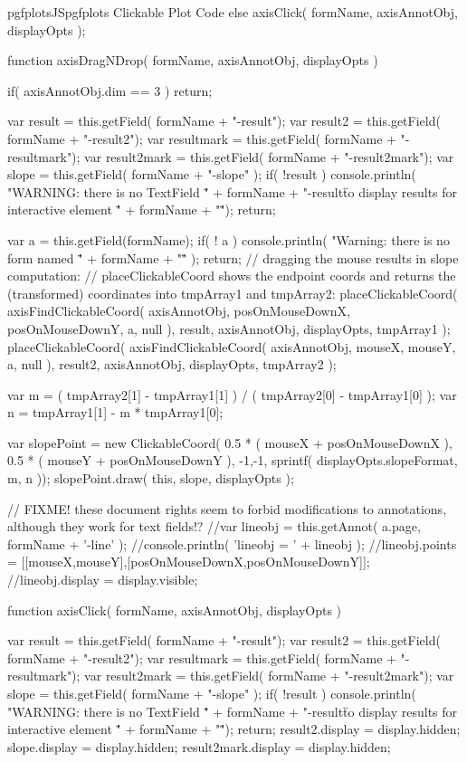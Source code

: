 {{\begin{insDLJS}[processAnnotatedPlot]{pgfplotsJS}{pgfplots Clickable Plot Code}
{{	} else {
		axisClick( formName, axisAnnotObj, displayOpts );
	}
}

function axisDragNDrop( formName, axisAnnotObj, displayOpts )
{
	if( axisAnnotObj.dim == 3 )
		return;

	var result = this.getField( formName + "-result");
	var result2 = this.getField( formName + "-result2");
	var resultmark = this.getField( formName + "-resultmark");
	var result2mark = this.getField( formName + "-result2mark");
	var slope 	= this.getField( formName + "-slope" );
	if( !result ) {
		console.println( "WARNING: there is no TextField \"" + formName + "-result\" to display results for interactive element \"" + formName + "\"");
		return;
	}

	var a = this.getField(formName);
	if( ! a ) {
		console.println( "Warning: there is no form named \"" + formName + "\"" );
		return;
	}
	// dragging the mouse results in slope computation:
	// placeClickableCoord shows the endpoint coords and returns the (transformed) coordinates into tmpArray1 and tmpArray2:
	placeClickableCoord( 
		axisFindClickableCoord( axisAnnotObj, posOnMouseDownX, posOnMouseDownY, a, null ),
		result, axisAnnotObj, displayOpts, tmpArray1 );
	placeClickableCoord( 
		axisFindClickableCoord( axisAnnotObj, mouseX, mouseY, a, null ),
		result2, axisAnnotObj, displayOpts, tmpArray2 );

	var m =  ( tmpArray2[1] - tmpArray1[1] ) / ( tmpArray2[0] - tmpArray1[0] );
	var n =  tmpArray1[1] - m * tmpArray1[0];

	var slopePoint = new ClickableCoord(
		0.5 * ( mouseX + posOnMouseDownX ),
		0.5 * ( mouseY + posOnMouseDownY ),
		-1,-1,
		sprintf( displayOpts.slopeFormat, m, n ));
	slopePoint.draw(
		this,
		slope,
		displayOpts );

	// FIXME! these document rights seem to forbid modifications to annotations, although they work for text fields!?
	//var lineobj = this.getAnnot( a.page, formName + '-line' );
	//console.println( 'lineobj = ' + lineobj );
	//lineobj.points = [[mouseX,mouseY],[posOnMouseDownX,posOnMouseDownY]];
	//lineobj.display = display.visible;
}

function axisClick( formName, axisAnnotObj, displayOpts )
{
	var result = this.getField( formName + "-result");
	var result2 = this.getField( formName + "-result2");
	var resultmark = this.getField( formName + "-resultmark");
	var result2mark = this.getField( formName + "-result2mark");
	var slope 	= this.getField( formName + "-slope" );
	if( !result ) {
		console.println( "WARNING: there is no TextField \"" + formName + "-result\" to display results for interactive element \"" + formName + "\"");
		return;
	}
	result2.display = display.hidden;
	slope.display = display.hidden;
	result2mark.display = display.hidden;

}
\end{insDLJS}}}
